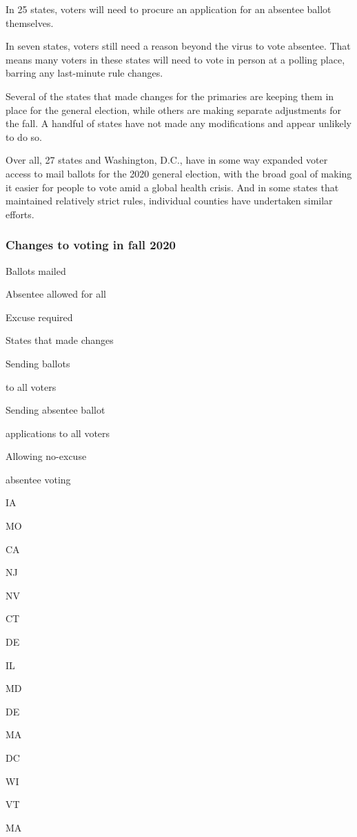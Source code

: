 In 25 states, voters will need to procure an application for an absentee
ballot themselves.

In seven states, voters still need a reason beyond the virus to vote
absentee. That means many voters in these states will need to vote in
person at a polling place, barring any last-minute rule changes.

Several of the states that made changes for the primaries are keeping
them in place for the general election, while others are making separate
adjustments for the fall. A handful of states have not made any
modifications and appear unlikely to do so.

Over all, 27 states and Washington, D.C., have in some way expanded
voter access to mail ballots for the 2020 general election, with the
broad goal of making it easier for people to vote amid a global health
crisis. And in some states that maintained relatively strict rules,
individual counties have undertaken similar efforts.

\hypertarget{changes-to-voting-in-fall-2020}{%
\subsubsection{Changes to voting in fall
2020}\label{changes-to-voting-in-fall-2020}}

Ballots mailed

Absentee allowed for all

Excuse required

States that made changes

Sending ballots

to all voters

Sending absentee ballot

applications to all voters

Allowing no-excuse

absentee voting

IA

MO

CA

NJ

NV

CT

DE

IL

MD

DE

MA

DC

WI

VT

MA

